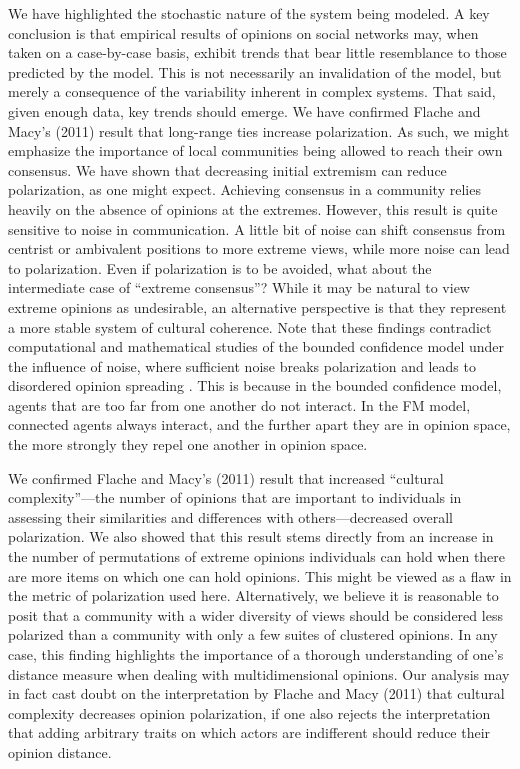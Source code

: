 We have highlighted the stochastic nature of the system being modeled. A key conclusion is that empirical results of opinions on social networks may, when taken on a case-by-case basis, exhibit trends that bear little resemblance to those predicted by the model. This is not necessarily an invalidation of the model, but merely a consequence of the variability inherent in complex systems. That said, given enough data, key trends should emerge.  
We have confirmed Flache and Macy's (2011) result that long-range ties increase polarization. As such, we might emphasize the importance of local communities being allowed to reach their own consensus. We have shown that decreasing initial extremism can reduce polarization, as one might expect. Achieving consensus in a community relies heavily on the absence of opinions at the extremes. 
However, this result is quite sensitive to noise in communication. A little bit of noise can shift consensus from centrist or ambivalent positions to more extreme views, while more noise can lead to polarization. 
Even if polarization is to be avoided, what about the intermediate case of 
``extreme consensus''? While it may be natural to view extreme opinions as 
undesirable, an alternative perspective is that they represent a more stable system of 
cultural coherence. Note that these findings contradict computational and mathematical studies of the 
bounded confidence model under the influence of noise, where sufficient noise breaks 
polarization and leads to disordered opinion spreading \cite{Pineda2009,Carro2013,Kurahashi-Nakamura2016}. 
This is because in the bounded confidence model, agents that are too far from 
one another do not interact. In the FM model, connected agents always interact, 
and the further apart they are in opinion space, the more strongly they repel 
one another in opinion space. 

We confirmed Flache and Macy's (2011) result that increased ``cultural complexity''---the number of  opinions that are important to individuals in assessing their similarities and differences with
others---decreased overall polarization. We also showed that this result stems directly from an increase in the number of permutations of extreme opinions individuals can hold when there are more items on which one can hold opinions. This might be viewed as a flaw in the metric of polarization used here. Alternatively, we believe it is reasonable to posit that a community with a wider diversity of views should be considered less polarized than a community with only a few suites of clustered opinions. In any case, this finding highlights the importance of a thorough understanding of one’s distance measure when dealing with multidimensional opinions. 
Our analysis may in fact cast doubt on the interpretation by Flache and Macy (2011) that 
cultural complexity decreases opinion polarization, if one also rejects the interpretation 
that adding arbitrary traits on which actors are indifferent should reduce their opinion 
distance.


